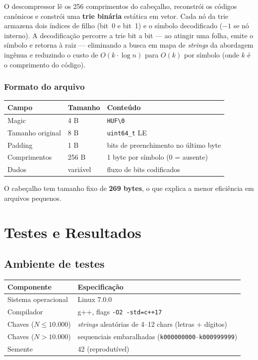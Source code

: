 \documentclass{ifpr-pinhais}
\begin{document}
O descompressor lê os 256 comprimentos do cabeçalho, reconstrói os códigos canônicos e constrói uma \textbf{trie binária} estática em vetor. Cada nó da trie armazena dois índices de filho (bit~0 e bit~1) e o símbolo decodificado ($-1$ se nó interno). A decodificação percorre a trie bit a bit — ao atingir uma folha, emite o símbolo e retorna à raiz — eliminando a busca em mapa de \textit{strings} da abordagem ingênua e reduzindo o custo de $O(k \cdot \log n)$ para $O(k)$ por símbolo (onde $k$ é o comprimento do código).

\subsubsection{Formato do arquivo}

\begin{center}
\begin{tabular}{lll}
\toprule
Campo & Tamanho & Conteúdo \\
\midrule
Magic & 4 B & \texttt{HUF\textbackslash 0} \\
Tamanho original & 8 B & \texttt{uint64\_t} LE \\
Padding & 1 B & bits de preenchimento no último byte \\
Comprimentos & 256 B & 1 byte por símbolo (0 = ausente) \\
Dados & variável & fluxo de bits codificados \\
\bottomrule
\end{tabular}
\end{center}

O cabeçalho tem tamanho fixo de \textbf{269 bytes}, o que explica a menor eficiência em arquivos pequenos.

\section{Testes e Resultados}

\subsection{Ambiente de testes}

\begin{center}
\begin{tabular}{ll}
\toprule
Componente & Especificação \\
\midrule
Sistema operacional & Linux 7.0.0 \\
Compilador & g++, flags \texttt{-O2 -std=c++17} \\
Chaves ($N \leq 10.000$) & \textit{strings} aleatórias de 4--12 chars (letras + dígitos) \\
Chaves ($N > 10.000$) & sequenciais embaralhadas (\texttt{k000000000}--\texttt{k000999999}) \\
Semente & 42 (reprodutível) \\
\bottomrule
\end{tabular}
\end{center}
\end{document}

